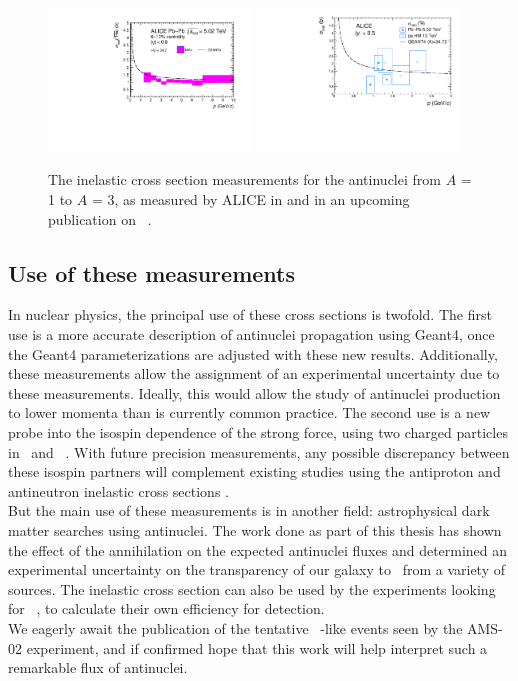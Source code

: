 \begin{figure}
    \includegraphics[width=0.48\textwidth]{figures/Antihelium_inelastic_cross_section_PbPb.pdf}
    \includegraphics[width=0.48\textwidth]{figures/FinalXS_antit_paper.pdf}
    \caption{The inelastic cross section measurements for the antinuclei from $A$ = 1 to $A$ = 3, as measured by ALICE in \cite{antideuteronXS, antiHe3XS} and in an upcoming publication on \atrit\ . }
    \label{fig:AntinucleiInelasticCross_Sections_Full}
\end{figure}

\subsection{Use of these measurements}
In nuclear physics, the principal use of these cross sections is twofold. The first use is a more accurate description of antinuclei propagation using Geant4, once the Geant4 parameterizations are adjusted with these new results. Additionally, these measurements allow the assignment of an experimental uncertainty due to these measurements. Ideally, this would allow the study of antinuclei production to lower momenta than is currently common practice. The second use is a new probe into the isospin dependence of the strong force, using two charged particles in \ahe\ and \atrit\ . With future precision measurements, any possible discrepancy between these isospin partners will complement existing studies using the antiproton and antineutron inelastic cross sections \cite{Bianconi_2014}.\\


But the main use of these measurements is in another field: astrophysical dark matter searches using antinuclei. The work done as part of this thesis has shown the effect of the annihilation on the expected antinuclei fluxes and determined an experimental uncertainty on the transparency of our galaxy to \ahe\ from a variety of sources. The inelastic cross section can also be used by the experiments looking for \ahe\ , to calculate their own efficiency for detection. \\
We eagerly await the publication of the tentative \ahe\ -like events seen by the AMS-02 experiment, and if confirmed hope that this work will help interpret such a remarkable flux of antinuclei. \\

